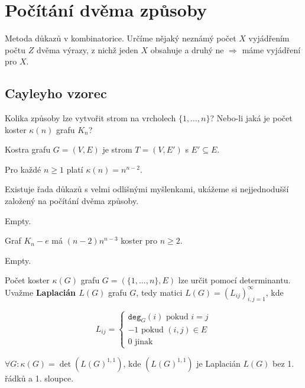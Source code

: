 \chapter{Počítání dvěma způsoby}

Metoda důkazů v kombinatorice. Určíme nějaký neznámý počet $X$ vyjádřením počtu $Z$ dvěma výrazy, z nichž jeden $X$ obsahuje a druhý ne $\Rightarrow$ máme vyjádření pro $X$.

\section{Cayleyho vzorec}

Kolika způsoby lze vytvořit strom na vrcholech $\{ 1, \dots , n \}$? Nebo-li jaká je počet koster $\kappa (n)$ grafu $K_{n}$? 

\begin{definice}
	Kostra grafu $G = (V, E)$ je strom $T = (V, E')$ s $E' \subseteq E$.
\end{definice}


\begin{veta}
	Pro každé $n \geq 1$ platí $\kappa (n) = n^{n-2}$.
\end{veta}

Existuje řada důkazů s velmi odlišnými myšlenkami, ukážeme si nejjednodušší založený na počítání dvěma způsoby.

\begin{dukaz}
	Empty.
\end{dukaz}

\begin{veta}
	Graf $K_{n}-e$ má $(n-2)n^{n-3}$ koster pro $n \geq 2$.
\end{veta}

\begin{dukaz}
	Empty.
\end{dukaz}


Počet koster $\kappa (G)$ grafu $G = (\{ 1, \dots , n \}, E)$ lze určit pomocí determinantu. Uvažme \textbf{Laplacián $L(G)$} grafu $G$, tedy matici $L(G) = (L_{ij})_{i,j=1}^{\infty}$, kde

$$
L_{ij} =
\left\{
\begin{array}{ll}
	\mathtt{deg}_{G}(i) \text{ pokud } i=j \\
	-1 \text{ pokud } (i,j) \in E \\
	0 \text{ jinak }
\end{array}
\right.
$$

\begin{veta}
	$\forall G : \kappa (G) = \det (L(G)^{1,1})$, kde $(L(G)^{1,1})$ je Laplacián $L(G)$ bez 1. řádků a 1. sloupce.
\end{veta}

